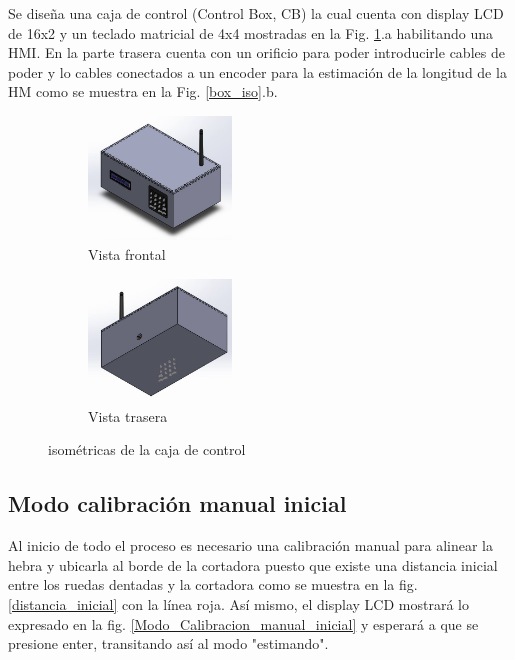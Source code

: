 \documentclass[main_conf.tex]{subfiles}
\begin{document}
Se diseña una caja de control (Control Box, CB) la cual cuenta
con display LCD de 16x2 y un teclado matricial de 4x4 mostradas
en la Fig. \ref{box:iso}.a habilitando una HMI. En la parte trasera
cuenta con un orificio para poder introducirle cables de poder y
lo cables conectados a un encoder para la estimación de la longitud
de la HM como se muestra en la Fig. \ref{box_iso}.b.

\begin{figure}[t]
  \centering
  \begin{subfigure}[b]{0.5\textwidth}
    \centering
    \includegraphics[width=1.5in]{../img/box/iso_front.png}
    \caption{Vista frontal}
  \end{subfigure}

  \begin{subfigure}[b]{0.5\textwidth}
    \centering
    \includegraphics[width=1.5in]{../img/box/iso_back.png}
    \caption{Vista trasera}
  \end{subfigure}

  \caption{isométricas de la caja de control}
  \label{box:iso}
\end{figure}


\subsection{Modo calibración manual inicial}
Al inicio de todo el proceso es necesario una calibración manual para
alinear la hebra y ubicarla al borde de la cortadora puesto que existe
una distancia inicial entre los ruedas dentadas y la cortadora como se
muestra en la fig. \ref{distancia_inicial} con la línea roja.
Así mismo, el display LCD mostrará lo expresado en la fig.
\ref{Modo_Calibracion_manual_inicial} y esperará a que se presione
enter, transitando así al modo "estimando".
\end{document}
